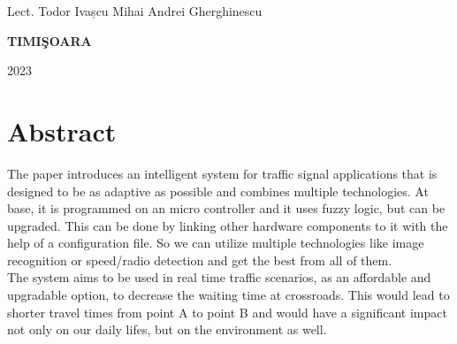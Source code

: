 \documentclass[17pt]{report}
\begin{document}
{\large{}

\noindent Lect. Todor Ivașcu \hfill 
\noindent Mihai Andrei Gherghinescu
}



\vfill
\begin{center}
{\bf TIMI\c SOARA

2023}
\end{center}

\newpage
\normalsize{}

\section*{Abstract}
\indent \indent
The paper introduces an intelligent system for traffic
signal applications that is designed to be as adaptive
as possible and combines multiple technologies.
At base, it is programmed on an micro controller and it
uses fuzzy logic, but can be upgraded. This can be done by
linking other hardware components to it with the help of a
configuration file. So we can utilize multiple technologies
like image recognition or speed/radio detection and get the
best from all of them.\\
\indent The system aims to be used in real time
traffic scenarios, as an affordable and upgradable option,
to decrease the waiting time at crossroads.
This would lead to shorter travel times from point
A to point B and would have a significant impact not only
on our daily lifes, but on the environment as well.

\pagebreak

\tableofcontents

\pagebreak

\listoffigures
\pagebreak
\end{document}
